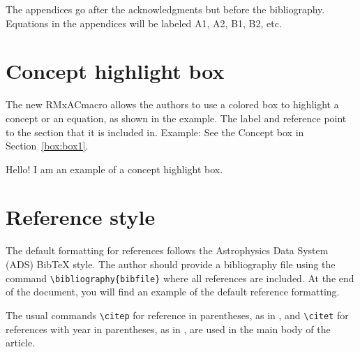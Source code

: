 \documentclass[11pt,proc,twoside]{RMxAC_rho-class/RMxAC_rho}
\newcommand\rmaatex{RMxAC}
\newcommand{\CS}[1]{\texttt{\textbackslash #1}}
\begin{document}
The appendices go after the acknowledgments but before the
bibliography. Equations in the appendices will be labeled
A1, A2, B1, B2, etc.

\section{Concept highlight box}

The new \rmaatex macro allows the authors to use a colored box to highlight a concept or an equation, as shown in the example. The label and reference point to the section that it is included in. Example: See the Concept box in Section~\ref{box:box1}.  
    
        \begin{rhoenv}[frametitle=Highlight Concept Box]
            Hello! I am an example of a concept highlight box. \label{box:box1}
        \end{rhoenv}
    





\section{Reference style}

    The default formatting for references follows the Astrophysics Data System (ADS) BibTeX style. The author should provide a bibliography file using the command \CS{bibliography}\verb|{bibfile}| where all references are included. At the end of the document, you will find an example of the default reference formatting. 
    
    The usual commands \CS{citep} for reference in parentheses, as in \citep{Roman23},  and \CS{citet} for references with year in parentheses, as in \citet{Roman23}, are used in the main body of the article.





\end{document}
